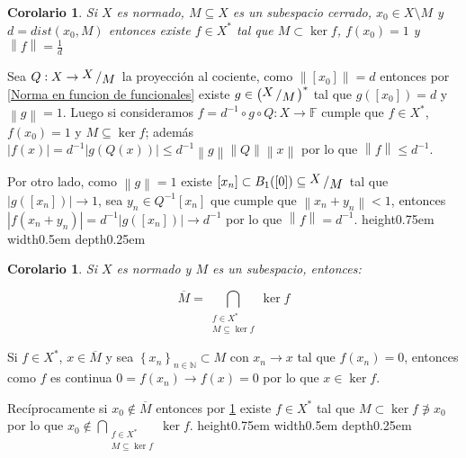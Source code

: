 \documentclass[11pt]{article}
\newcommand{\N}{{\mathbb{N}}}
\newcommand{\norm}[1]{\left\lVert#1\right\rVert}
\newcommand{\abs}[1]{\left\lvert#1\right\rvert}
\newcommand{\sett}[1]{\left\lbrace#1\right\rbrace}
\newcommand{\Bigcap}[2]{\bigcap\limits_{#1}{#2}}
\newcommand{\quotient}[2]{{\raisebox{.2em}{$#1$}\left/\raisebox{-.2em}{$#2$}\right.}}
\numberwithin{theorem}{subsection}
\newtheorem{corollary}[theorem]{Corolario}
\newenvironment{proof}[1][Demostraci\'on]{\begin{trivlist}
		\item[\hskip \labelsep {\bfseries #1}]}{\end{trivlist}}
\newcommand{\qed}{\nobreak \ifvmode \relax \else
	\ifdim\lastskip<1.5em \hskip-\lastskip
	\hskip1.5em plus0em minus0.5em \fi \nobreak
	\vrule height0.75em width0.5em depth0.25em\fi}
\begin{document}
\begin{corollary}
	\label{Si x no esta ne la clasura de un subespacio existe un funcional que separa}
	Si $X$ es normado, $M \subseteq X$ es un subespacio cerrado, $x_0 \in X \setminus M$ y $d = dist\left(x_0 ,M\right)$ entonces existe $f \in X^{\ast}$ tal que $M \subset \ker f$, $f(x_0) = 1$ y $\norm{f} = \frac{1}{d}$
\end{corollary}

\begin{proof}
	Sea $Q : X \rightarrow \quotient{X}{M}$ la proyecci\'on al cociente, como $\norm{[x_0]} = d$ entonces por \ref{Norma en funcion de funcionales} existe $g \in \left(\quotient{X}{M}\right)^{\ast}$ tal que $g\left([x_0]\right) = d$ y $\norm{g} = 1$. Luego si consideramos $f =  d^{-1} \circ g \circ Q : X \rightarrow \mathbb{F}$ cumple que $f \in X^{\ast}$, $f(x_0) = 1$ y $M \subseteq \ker f$; adem\'as $\abs{f(x)} = d^{-1} \abs{g(Q(x))} \leq d^{-1} \norm{g}\norm{Q} \norm{x}$ por lo que $\norm{f} \leq d^{-1}$.
	
	Por otro lado, como $\norm{g}=1$ existe $[x_n] \subset B_1([0]) \subseteq \quotient{X}{M}$ tal que $\abs{g([x_n])} \rightarrow 1$, sea $y_n \in Q^{-1}[x_n]$ que cumple que $\norm{x_n + y_n} < 1$, entonces $\abs{f(x_n+y_n)} = d^{-1} \abs{g([x_n])} \rightarrow d^{-1}$ por lo que $\norm{f} = d^{-1}$. \qed
	
\end{proof}

\begin{corollary}
	\label{Clausura en funcion de funcionales}
	Si $X$ es normado y $M$ es un subespacio, entonces:
	
	\begin{equation}
	\label{eq: Clausura en funcion de funcionales}
		\overline{M} = \Bigcap{\substack{f \in X^{\ast} \\ M \subseteq \ker f}}{\ker f}	
	\end{equation}
	
\end{corollary}

\begin{proof}
	Si $f \in X^{\ast}$, $x \in \overline{M}$ y sea $\sett{x_n}_{n \in \N} \subset M$ con $x_n \rightarrow x$ tal que $f(x_n) = 0$, entonces como $f$ es continua $0 = f(x_n) \rightarrow f(x) = 0$ por lo que $x \in \ker f$.
	
	Rec\'iprocamente si $x_0 \not \in \overline{M}$ entonces por \ref{Si x no esta ne la clasura de un subespacio existe un funcional que separa} existe $f \in X^{\ast}$ tal que $M \subset \ker f \not \ni x_0$ por lo que $x_0 \not \in \Bigcap{\substack{f \in X^{\ast} \\ M \subseteq \ker f}}{\ker f}$. \qed
	
\end{proof}
\end{document}
